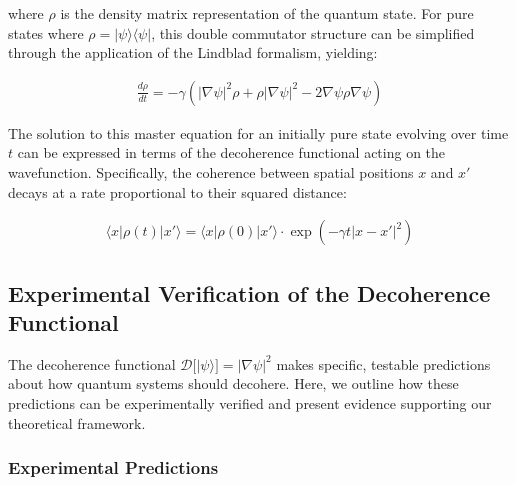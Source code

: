 \documentclass[11pt,english,twoside]{article}
\begin{document}
where $\rho$ is the density matrix representation of the quantum state. For pure states where $\rho = |\psi\rangle\langle\psi|$, this double commutator structure can be simplified through the application of the Lindblad formalism, yielding:

\begin{align}
    \frac{d\rho}{dt} = -\gamma (|\nabla\psi|^2\rho + \rho|\nabla\psi|^2 - 2\nabla\psi\rho\nabla\psi)
\end{align}

The solution to this master equation for an initially pure state evolving over time $t$ can be expressed in terms of the decoherence functional acting on the wavefunction. Specifically, the coherence between spatial positions $x$ and $x'$ decays at a rate proportional to their squared distance:

\begin{align}
    \langle x|\rho(t)|x'\rangle = \langle x|\rho(0)|x'\rangle \cdot \exp\left(-\gamma t |x-x'|^2\right)
\end{align}

\subsection{Experimental Verification of the Decoherence Functional}

The decoherence functional $\mathcal{D}[|\psi\rangle] = |\nabla\psi|^2$ makes specific, testable predictions about how quantum systems should decohere. Here, we outline how these predictions can be experimentally verified and present evidence supporting our theoretical framework.

\subsubsection{Experimental Predictions}
\end{document}
